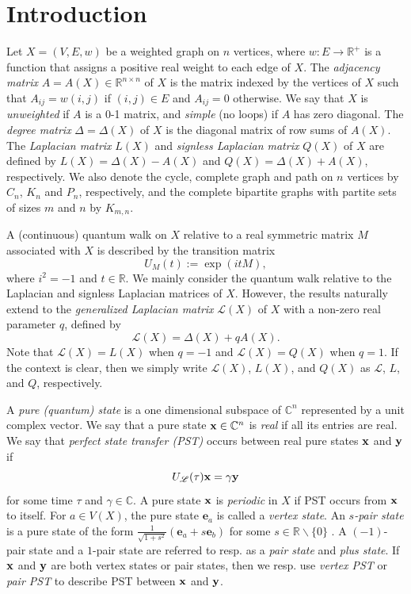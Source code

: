 \documentclass[12pt,a4paper]{article}
\def \e {{\mathbf e}}
\def \x {{\bf x}}
\def \y {{\bf y}}
\newcommand{\ob}[1]{\left(#1\right)}
\begin{document}
\section{Introduction}
Let $X = (V, E, w)$ be a weighted graph on $n$ vertices, where $w: E \rightarrow \mathbb{R}^+$ is a function that assigns a positive real weight to each edge of $X$. The \emph{adjacency matrix} $A=A(X) \in \mathbb{R}^{n \times n}$ of $X$ is the matrix indexed by the vertices of $X$ such that $A_{ij}=w(i,j)$ if $(i,j) \in E$ and $A_{ij}=0$ otherwise. We say that $X$ is \textit{unweighted} if $A$ is a 0-1 matrix, and \textit{simple} (no loops) if $A$ has zero diagonal. The \emph{degree matrix} $\Delta=\Delta(X)$ of $X$ is the diagonal matrix of row sums of $A(X)$. The \emph{Laplacian matrix} $L(X)$ and \emph{signless Laplacian matrix} $Q(X)$ of $X$ are defined by $L(X) = \Delta(X) - A(X)$ and $Q(X) = \Delta(X) + A(X)$, respectively. We also denote the cycle, complete graph and path on $n$ vertices by $C_n$, $K_n$ and $P_n$, respectively, and the complete bipartite graphs with partite sets of sizes $m$ and $n$ by $K_{m,n}$.

A (continuous) quantum walk on $X$ relative to a real symmetric matrix $M$ associated with $X$ is described by the transition matrix
\[
U_{M}(t) := \exp{\ob{i t M}},
\]
where $i^2=-1$ and $t \in \mathbb{R}$. We mainly consider the quantum walk relative to the Laplacian and signless Laplacian matrices of $X.$ However, the results naturally extend to the \emph{generalized Laplacian matrix} $\mathscr{L}(X)$ of $X$ with a non-zero real parameter $q$, defined by
\begin{equation*}
 \mathscr{L}(X) = \Delta(X) +qA(X).
\end{equation*}
Note that $\mathscr{L}(X)=L(X)$ when $q = -1$ and $\mathscr{L}(X)=Q(X)$ when $q = 1$. If the context is clear, then we simply write $\mathscr{L}(X)$, $L(X)$, and $Q(X)$ as $\mathscr{L}$, $L$, and $Q$, respectively.

A \textit{pure (quantum) state} is a one dimensional subspace of $\mathbb{C}^n$ represented by a unit complex vector. We say that a pure state $\x\in\mathbb{C}^n$ is \emph{real} if all its entries are real. We say that \emph{perfect state transfer (PST)} occurs between real pure states $\x$ and $\y$ if 
\[U_\mathscr{L}(\tau) \x = \gamma \y
\] 
for some time $\tau$ and $\gamma \in \mathbb{C}$. A pure state $\x$ is \emph{periodic} in $X$ if PST occurs from $\x$ to itself. For $a\in V(X)$, the pure state $\e_a$ is called a \emph{vertex state}. An \emph{$s$-pair state} is a pure state of the form $\frac{1}{\sqrt{1 + s^2}} \left( \e_a + s \e_b \right)$ for some $s\in\mathbb{R}\backslash\{0\}$ \cite{kim}. A $(-1)$-pair state and a $1$-pair state are referred to resp. as a \emph{pair state} and \emph{plus state}. If $\x$ and $\y$ are both vertex states or pair states, then we resp. use \emph{vertex PST} or \emph{pair PST} to describe PST between $\x$ and $\y$.
\end{document}
